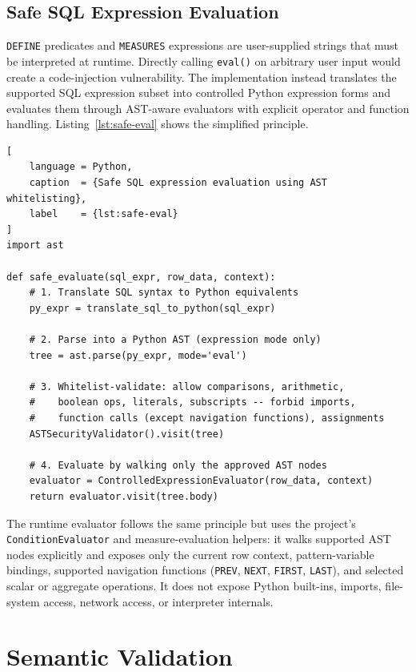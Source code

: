 \subsection{Safe SQL Expression Evaluation}
\label{subsec:meth-safe-eval}

\texttt{DEFINE} predicates and \texttt{MEASURES} expressions are
user-supplied strings that must be interpreted at runtime.  Directly
calling \texttt{eval()} on arbitrary user input would create a
code-injection vulnerability.  The implementation instead translates
the supported SQL expression subset into controlled Python expression
forms and evaluates them through AST-aware evaluators with explicit
operator and function handling.  Listing~\ref{lst:safe-eval} shows
the simplified principle.

\begin{lstlisting}[
    language = Python,
    caption  = {Safe SQL expression evaluation using AST whitelisting},
    label    = {lst:safe-eval}
]
import ast

def safe_evaluate(sql_expr, row_data, context):
    # 1. Translate SQL syntax to Python equivalents
    py_expr = translate_sql_to_python(sql_expr)

    # 2. Parse into a Python AST (expression mode only)
    tree = ast.parse(py_expr, mode='eval')

    # 3. Whitelist-validate: allow comparisons, arithmetic,
    #    boolean ops, literals, subscripts -- forbid imports,
    #    function calls (except navigation functions), assignments
    ASTSecurityValidator().visit(tree)

    # 4. Evaluate by walking only the approved AST nodes
    evaluator = ControlledExpressionEvaluator(row_data, context)
    return evaluator.visit(tree.body)
\end{lstlisting}

The runtime evaluator follows the same principle but uses the
project's \texttt{ConditionEvaluator} and measure-evaluation helpers:
it walks supported AST nodes explicitly and exposes only the current
row context, pattern-variable bindings, supported navigation
functions (\texttt{PREV}, \texttt{NEXT}, \texttt{FIRST},
\texttt{LAST}), and selected scalar or aggregate operations.  It does
not expose Python built-ins, imports, file-system access, network
access, or interpreter internals.


\section{Semantic Validation}
\label{sec:meth-semantic}

